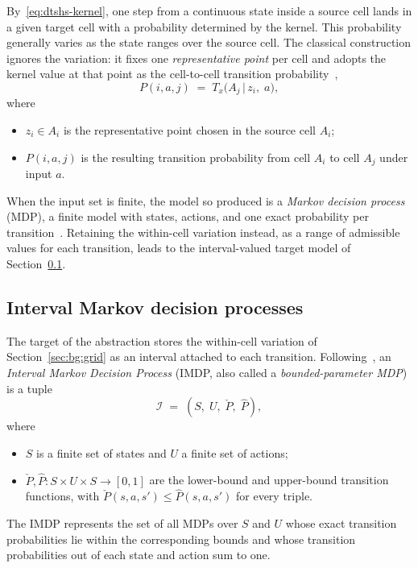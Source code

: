 \documentclass[11pt,a4paper]{article}
\theoremstyle{plain}
\theoremstyle{remark}
\begin{document}
	By~\eqref{eq:dtshs-kernel}, one step from a continuous state inside a source cell lands in a given target cell with a probability determined by the kernel. This probability generally varies as the state ranges over the source cell. The classical construction ignores the variation: it fixes one \emph{representative point} per cell and adopts the kernel value at that point as the cell-to-cell transition probability~\cite{LSAZ22},
	\begin{equation}
		P(i, a, j) \;=\; T_x\bigl(A_j \,\big|\, z_i,\; a\bigr),
		\label{eq:reppoint}
	\end{equation}
	where
	\begin{itemize}
		\item $z_i \in A_i$ is the representative point chosen in the source cell $A_i$;
		\item $P(i, a, j)$ is the resulting transition probability from cell $A_i$ to cell $A_j$ under input $a$.
	\end{itemize}
	When the input set is finite, the model so produced is a \emph{Markov decision process} (MDP), a finite model with states, actions, and one exact probability per transition~\cite{KNP25}. Retaining the within-cell variation instead, as a range of admissible values for each transition, leads to the interval-valued target model of Section~\ref{sec:bg:imdp}.
	
	\subsection{Interval Markov decision processes}
	\label{sec:bg:imdp}
	
	The target of the abstraction stores the within-cell variation of Section~\ref{sec:bg:grid} as an interval attached to each transition. Following~\cite{GLD00}, an \emph{Interval Markov Decision Process} (IMDP, also called a \emph{bounded-parameter MDP}) is a tuple
	\begin{equation}
		\mathcal{I} \;=\; (S,\; U,\; \check P,\; \hat P),
		\label{eq:imdp}
	\end{equation}
	where
	\begin{itemize}
		\item $S$ is a finite set of states and $U$ a finite set of actions;
		\item $\check P, \hat P : S \times U \times S \to [0,1]$ are the lower-bound and upper-bound transition functions, with $\check P(s,a,s') \le \hat P(s,a,s')$ for every triple.
	\end{itemize}
	The IMDP represents the set of all MDPs over $S$ and $U$ whose exact transition probabilities lie within the corresponding bounds and whose transition probabilities out of each state and action sum to one.
	
\end{document}
